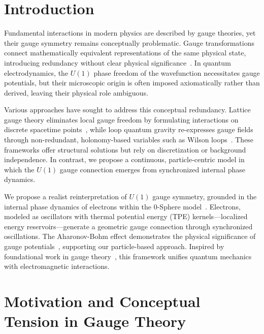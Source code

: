 \documentclass[%
 reprint,
 amsmath,amssymb,
 aps,
]{revtex4-1}
\numberwithin{equation}{section}%
\begin{document}
\section{Introduction}

Fundamental interactions in modern physics are described by gauge theories, yet their gauge symmetry remains conceptually problematic. Gauge transformations connect mathematically equivalent representations of the same physical state, introducing redundancy without clear physical significance~\cite{zee2010}. In quantum electrodynamics, the $U(1)$ phase freedom of the wavefunction necessitates gauge potentials, but their microscopic origin is often imposed axiomatically rather than derived, leaving their physical role ambiguous.

Various approaches have sought to address this conceptual redundancy. Lattice gauge theory eliminates local gauge freedom by formulating interactions on discrete spacetime points~\cite{wilson1974}, while loop quantum gravity re-expresses gauge fields through non-redundant, holonomy-based variables such as Wilson loops~\cite{rovelli1995}. These frameworks offer structural solutions but rely on discretization or background independence. In contrast, we propose a continuous, particle-centric model in which the $U(1)$ gauge connection emerges from synchronized internal phase dynamics.


We propose a realist reinterpretation of $U(1)$ gauge symmetry, grounded in the internal phase dynamics of electrons within the 0-Sphere model~\cite{hanamura2024quantum}. Electrons, modeled as oscillators with thermal potential energy (TPE) kernels---localized energy reservoirs---generate a geometric gauge connection through synchronized oscillations. The Aharonov-Bohm effect demonstrates the physical significance of gauge potentials~\cite{aharonov1959}, supporting our particle-based approach. Inspired by foundational work in gauge theory~\cite{weyl1929, yang1954}, this framework unifies quantum mechanics with electromagnetic interactions.


\section{Motivation and Conceptual Tension in Gauge Theory}
\end{document}

